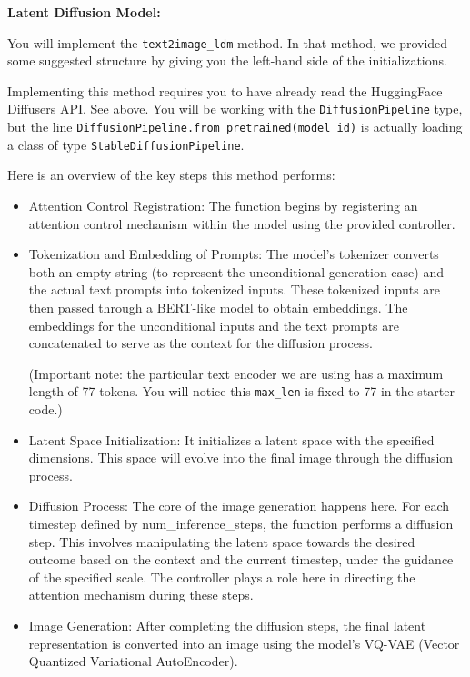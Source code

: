 \documentclass[11pt,addpoints,answers]{exam}
\begin{document}
\begin{questions}
\textbf{Latent Diffusion Model:} 

You will implement the \lstinline{text2image_ldm} method. In that method, we provided some suggested structure by giving you the left-hand side of the initializations. 

Implementing this method requires you to have already read the HuggingFace Diffusers API. See above. You will be working with the \lstinline{DiffusionPipeline} type, but the line \lstinline{DiffusionPipeline.from_pretrained(model_id)} is actually loading a class of type \lstinline{StableDiffusionPipeline}.


Here is an overview of the key steps this method performs:
\begin{itemize}
 
 \item Attention Control Registration: The function begins by registering an attention control mechanism within the model using the provided controller.
 
 \item Tokenization and Embedding of Prompts: The model's tokenizer converts both an empty string (to represent the unconditional generation case) and the actual text prompts into tokenized inputs. These tokenized inputs are then passed through a BERT-like model to obtain embeddings. The embeddings for the unconditional inputs and the text prompts are concatenated to serve as the context for the diffusion process.

(Important note: the particular text encoder we are using has a maximum length of 77 tokens. You will notice this \lstinline{max_len} is fixed to 77 in the starter code.)
 
 \item Latent Space Initialization: It initializes a latent space with the specified dimensions. This space will evolve into the final image through the diffusion process.
 
  \item Diffusion Process: The core of the image generation happens here. For each timestep defined by num\_inference\_steps, the function performs a diffusion step. This involves manipulating the latent space towards the desired outcome based on the context and the current timestep, under the guidance of the specified scale. The controller plays a role here in directing the attention mechanism during these steps.

  \item Image Generation: After completing the diffusion steps, the final latent representation is converted into an image using the model's VQ-VAE (Vector Quantized Variational AutoEncoder).


\end{itemize}
\end{questions}
\end{document}
